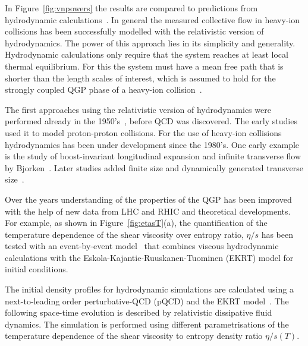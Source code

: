 In Figure~\ref{fig:vnpowers} the results are compared to predictions from hydrodynamic calculations~\cite{Schenke:2011tv}. In general the measured collective flow in heavy-ion collisions has been successfully modelled with the relativistic version of hydrodynamics. The power of this approach lies in its simplicity and generality. Hydrodynamic calculations only require that the system reaches at least local thermal equilibrium. For this the system must have a mean free path that is shorter than the length scales of interest, which is assumed to hold for the strongly coupled QGP phase of a heavy-ion collision~\cite{Romatschke:2009im}.

The first approaches using the relativistic version of hydrodynamics were performed already in the 1950's~\cite{Landau:1953gs}, before QCD was discovered. The early studies used it to model proton-proton collisions. For the use of heavy-ion collisions hydrodynamics has been under development since the 1980's. One early example is the study of boost-invariant longitudinal expansion and infinite transverse flow by Bjorken~\cite{PhysRevD.27.140}. Later studies added finite size and dynamically generated transverse size~\cite{Baym:1984sr, PhysRevD.34.794}. 


Over the years understanding of the properties of the QGP has been improved with the help of new data from LHC and RHIC and theoretical developments.
For example, as shown in Figure~\ref{fig:etasT}(a), the quantification of the temperature dependence of the shear viscosity over entropy ratio, $\eta/s$ has been tested with an event-by-event model~\cite{Niemi:2015qia} that combines viscous hydrodynamic calculations with the Eskola-Kajantie-Ruuskanen-Tuominen (EKRT) model for initial conditions.

The initial density profiles for hydrodynamic simulations are calculated using a next-to-leading order perturbative-QCD (pQCD) and the EKRT model~\cite{Paatelainen:2012at,Paatelainen:2013eea}. The following space-time evolution is described by relativistic dissipative fluid dynamics. The simulation is performed using different parametrisations of the temperature dependence of the shear viscosity to entropy density ratio $\eta/s(T)$. 

